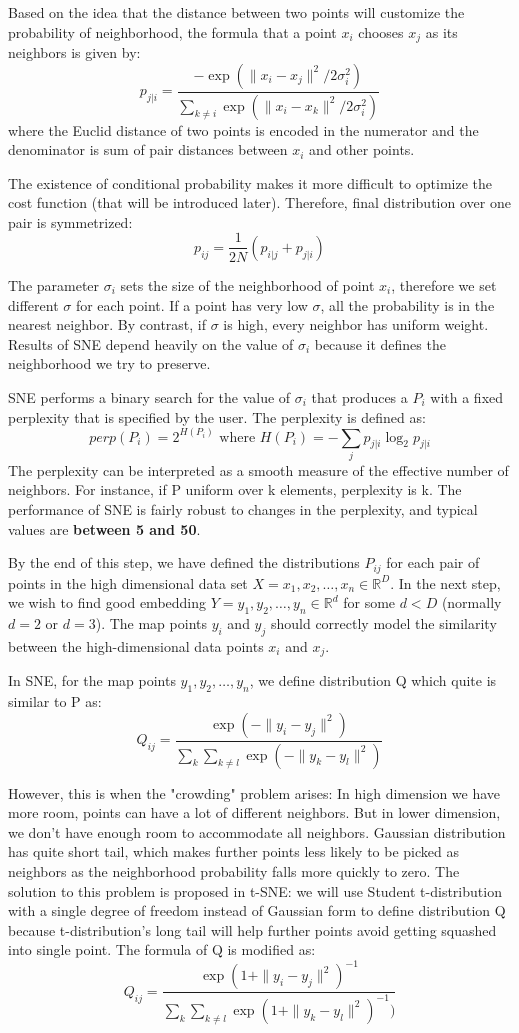 \documentclass[a4paper, 12pt]{article}  %
\begin{document}
Based on the idea that the distance between two points will customize the probability of neighborhood, the formula that a point $x_i$ chooses $x_j$ as its neighbors is given by:
\[p_{j|i} = \frac{-\exp (\|x_i - x_j\|^2 / 2\sigma_i^2)}{\sum_{k \neq i} \exp (\|x_i - x_k\|^2 / 2\sigma_i^2)}\]
where the Euclid distance of two points is encoded in the numerator and the denominator is sum of pair distances between $x_i$ and other points.

The existence of conditional probability makes it more difficult to optimize the cost function (that will be introduced later). Therefore, final distribution over one pair is symmetrized:
\[p_{ij} = \frac{1}{2N} (p_{i|j} + p_{j|i})\]

The parameter $\sigma_i$ sets the size of the neighborhood of point $x_i$, therefore we set different $\sigma$ for each point. If a point has very low $\sigma$, all the probability is in the nearest neighbor. By contrast, if $\sigma$ is high, every neighbor has uniform weight. Results of SNE depend heavily on the value of $\sigma_i$ because it defines the neighborhood we try to preserve.

SNE performs a binary search for the value of $\sigma_i$ that produces a $P_i$ with a fixed perplexity that is specified by the user. The perplexity is defined as:
\[perp(P_i) = 2^{H(P_i)} \text{ where } H(P_i) = -\sum_j p_{j|i} \log_2 p_{j|i}\]
The perplexity can be interpreted as a smooth measure of the effective number of neighbors. For instance, if P uniform over k elements, perplexity is k. The performance of SNE is fairly robust to changes in the perplexity, and typical values are \textbf{between 5 and 50}.

By the end of this step, we have defined the distributions $P_{ij}$ for each pair of points in the high dimensional data set $X = {x_1, x_2, \hdots, x_n} \in \mathbb{R}^D$. In the next step, we wish to find good embedding $Y = {y_1, y_2, \hdots, y_n} \in \mathbb{R}^d$ for some $d < D$ (normally $d = 2$ or $d = 3$). The map points $y_i$ and $y_j$ should correctly model the similarity between the high-dimensional data points $x_i$ and $x_j$. 

In SNE, for the map points $y_1, y_2, \hdots, y_n$, we define distribution Q which quite is similar to P as:
\[Q_{ij} = \frac{\exp (-\|y_i - y_j\|^2)}{\sum_k \sum_{k \neq l} \exp (-\|y_k - y_l\|^2)}\]

However, this is when the "crowding" problem arises: In high dimension we have more room, points can have a lot of different neighbors. But in lower dimension, we don’t have enough room to accommodate all neighbors. Gaussian distribution has quite short tail, which makes further points less likely to be picked as neighbors as the neighborhood probability falls more quickly to zero. The solution to this problem is proposed in t-SNE: we will use Student t-distribution with a single degree of freedom instead of Gaussian form to define distribution Q because t-distribution's long tail will help further points avoid getting squashed into single point. The formula of Q is modified as:
\[Q_{ij} = \frac{\exp (1 + \|y_i - y_j\|^2)^{-1}}{\sum_k \sum_{k \neq l} \exp (1 + \|y_k - y_l\|^2)^{-1})}\]
\end{document}
